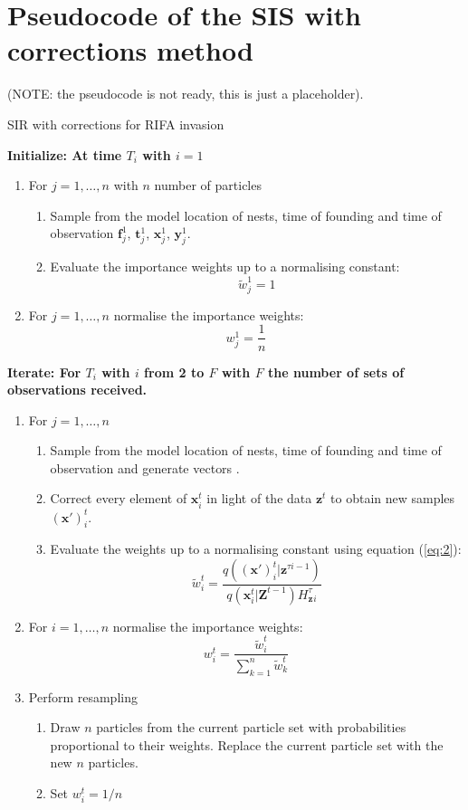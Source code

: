 \documentclass{article}
\renewcommand{\vec}[1]{\mathbf{#1}}
\begin{document}
{\color{red}
\section{Pseudocode of the SIS with corrections method}

(NOTE: the pseudocode is not ready, this is just a placeholder).

\begin{algorithm}[H]
\caption{SIR with corrections for RIFA invasion}
 \begin{algorithmic}

 \State  \bf{Initialize:} \normalfont At time $T_i$ with $i = 1$
            
\begin{enumerate}
	\item For $j = 1, \dots , n$ with $n$ number of particles
	\begin{enumerate}
		\item Sample from the model location of nests, time of founding and time of observation $\vec{f}^1_j$, $\vec{t}^1_j$, $\vec{x}^1_j$, $\vec{y}^1_j$.
		\item Evaluate the importance weights up to a normalising constant:
		\[
		\tilde{w}^{1}_{j} = 1
		\]
	\end{enumerate}
	\item For $j = 1, \dots , n$ normalise the importance weights: 
	\[
	w^{1}_{j} = \frac{1}{n}
	\]
\end{enumerate}

 \State  \bf{Iterate:} \normalfont For $T_i$ with $i$ from 2 to $F$ with $F$ the number of sets of observations received.

\begin{enumerate}
	\item For $j = 1, \dots , n$
	\begin{enumerate}
  		\item Sample from the model location of nests, time of founding and time of observation and generate vectors .
		\item Correct every element of $\vec{x}^t_i$ in light of the data $\vec{z}^t$ to obtain new samples $(\vec{x'})^t_i$.
		\item Evaluate the weights up to a normalising constant using equation (\ref{eq:2}):
		\[
		\tilde{w}^{t}_{i} = \frac{q(\vec{(x')}^{t}_i| \vec{z}^{\tau{i-1}})}{q(\vec{x}^{t}_i | \vec{Z}^{t-1}) H_\vec{z}^{\tau}_i}
		\]
	\end{enumerate}
	\item For $i = 1, \dots , n$ normalise the importance weights:
	\[
	w^{t}_{i} = \frac{\tilde{w}^t_i}{\sum_{k=1}^{n}\tilde{w}^{t}_k}
	\]
	\item Perform resampling
	\begin{enumerate}
	    \item Draw $n$ particles from the current particle set with probabilities proportional to their weights. Replace the current particle set with the new $n$ particles.
	    \item Set $w^t_i=1/n$
	\end{enumerate}
\end{enumerate}
  

\end{algorithmic}
\end{algorithm}}
\end{document}
